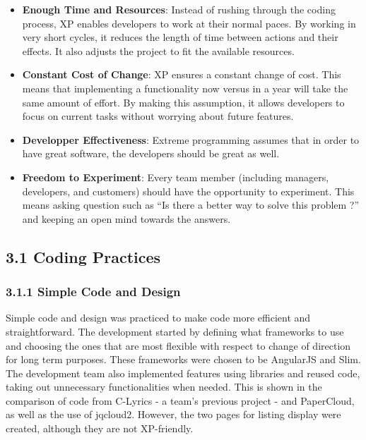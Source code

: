 \documentclass[]{article}
\begin{document}
\begin{itemize}
\itemsep1pt\parskip0pt
\item
  \textbf{Enough Time and Resources}: Instead of rushing through the
  coding process, XP enables developers to work at their normal paces.
  By working in very short cycles, it reduces the length of time between
  actions and their effects. It also adjusts the project to fit the
  available resources.
\item
  \textbf{Constant Cost of Change}: XP ensures a constant change of
  cost. This means that implementing a functionality now versus in a
  year will take the same amount of effort. By making this assumption,
  it allows developers to focus on current tasks without worrying about
  future features.
\item
  \textbf{Developper Effectiveness}: Extreme programming assumes that in
  order to have great software, the developers should be great as well.
\item
  \textbf{Freedom to Experiment}: Every team member (including managers,
  developers, and customers) should have the opportunity to experiment.
  This means asking question such as ``Is there a better way to solve
  this problem ?'' and keeping an open mind towards the answers.
\end{itemize}

\subsection{3.1 Coding Practices}\label{coding-practices}

\subsubsection{3.1.1 Simple Code and
Design}\label{simple-code-and-design}

Simple code and design was practiced to make code more efficient and
straightforward. The development started by defining what frameworks to
use and choosing the ones that are most flexible with respect to change
of direction for long term purposes. These frameworks were chosen to be
AngularJS and Slim. The development team also implemented features using
libraries and reused code, taking out unnecessary functionalities when
needed. This is shown in the comparison of code from C-Lyrics - a team's
previous project - and PaperCloud, as well as the use of jqcloud2.
However, the two pages for listing display were created, although they
are not XP-friendly.
\end{document}
